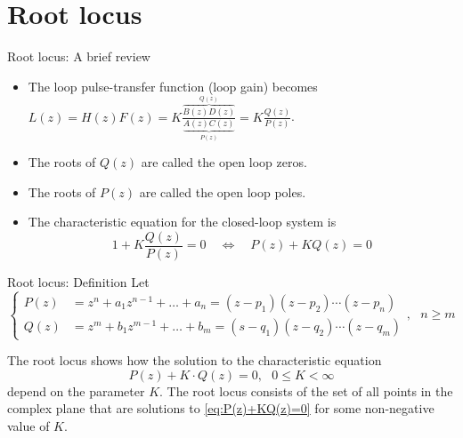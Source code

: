 \documentclass[presentation,aspectratio=169]{beamer}
\begin{document}
\section{Root locus}
\label{sec:orgd424d23}


\begin{frame}[label={sec:org7677301}]{Root locus: A brief review}

\begin{center}
\end{center}


\begin{itemize}
\item The loop pulse-transfer function (loop gain) becomes \(L(z) = H(z)F(z) = K\frac{\overbrace{B(z)D(z)}^{Q(z)}}{\underbrace{A(z)C(z)}_{P(z)}} = K \frac{Q(z)}{P(z)}\).
\item The roots of \(Q(z)\) are called the \alert{open loop zeros}.
\item The roots of \(P(z)\) are called the \alert{open loop poles}.
\item The characteristic equation for the closed-loop system is \[ 1 + K\frac{Q(z)}{P(z)} = 0 \quad \Leftrightarrow \quad P(z) + KQ(z) = 0\]
\end{itemize}
\end{frame}


\begin{frame}[label={sec:org4d6f28e}]{Root locus: Definition}
Let
\[\begin{cases} P(z)&=z^n+a_1z^{n-1}+\dots+a_n = (z-p_1)(z-p_2)\cdots(z-p_n)\\ 
Q(z)&=z^m+b_1 z^{m-1}+\dots+b_m=(s-q_1)(z-q_2)\cdots(z-q_m) \end{cases},\ \ \ n\ge m \]

The root locus shows how the \alert{solution} to the characteristic equation
\begin{equation}
\label{eq:P(z)+KQ(z)=0}
P(z)+K\cdot Q(z)=0,\ \ \ 0\le K<\infty
\end{equation}
depend on the parameter \(K\). The root locus consists of the set of all points in the complex plane that are solutions to \eqref{eq:P(z)+KQ(z)=0} for some non-negative value of \(K\).
\end{frame}
\end{document}
